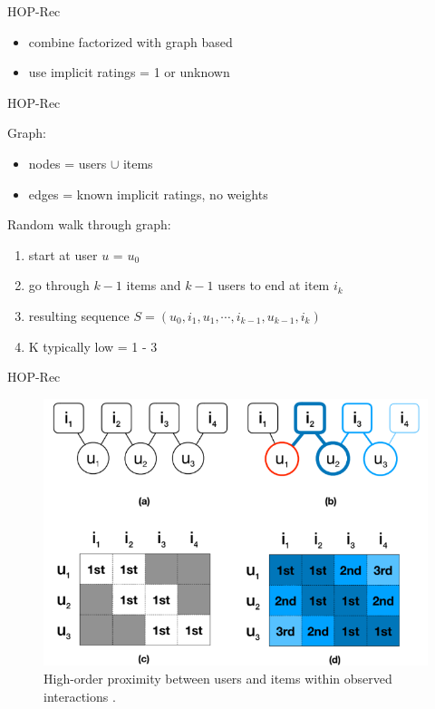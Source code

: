 \documentclass{beamer}
\begin{document}
\begin{frame}{HOP-Rec}

\begin{itemize}
\item combine factorized with graph based
\item use implicit ratings = 1 or unknown
\end{itemize}

\end{frame}
\begin{frame}{HOP-Rec}

Graph: 
\begin{itemize}
\item nodes = users  $\cup$ items
\item edges = known implicit ratings, no weights
\end{itemize}

Random walk through graph:
\begin{enumerate}
\item start at user $u$ = $u_0$
\item go through $k-1$ items and $k-1$ users to end at item $i_k$
\item resulting sequence $S = (u_0, i_1, u_1, \cdots , i_{k-1}, u_{k-1}, i_{k})$
\item K typically low = 1 - 3
\end{enumerate}

\end{frame}
\begin{frame}{HOP-Rec}

\begin{figure}[h]
\includegraphics[scale=0.60]{img/hop-rec}
\caption{High-order proximity between users and items
within observed interactions \cite{cit:hop-rec}.}
\end{figure}

\end{frame}
\end{document}
